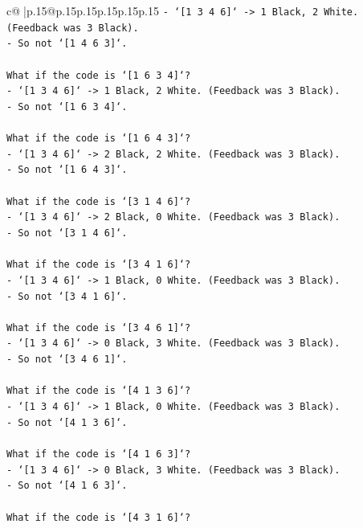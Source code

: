 \documentclass{article}
\begin{document}
{\begin{supertabular}{c@{$\;$}|p{.15\linewidth}@{}p{.15\linewidth}p{.15\linewidth}p{.15\linewidth}p{.15\linewidth}p{.15\linewidth}}
{{{\texttt{{-} `{[}1 3 4 6{]}` {-}> 1 Black, 2 White. (Feedback was 3 Black).} \\
\texttt{{-} So not `{[}1 4 6 3{]}`.} \\
\\ 
\texttt{What if the code is `{[}1 6 3 4{]}`?} \\
\texttt{{-} `{[}1 3 4 6{]}` {-}> 1 Black, 2 White. (Feedback was 3 Black).} \\
\texttt{{-} So not `{[}1 6 3 4{]}`.} \\
\\ 
\texttt{What if the code is `{[}1 6 4 3{]}`?} \\
\texttt{{-} `{[}1 3 4 6{]}` {-}> 2 Black, 2 White. (Feedback was 3 Black).} \\
\texttt{{-} So not `{[}1 6 4 3{]}`.} \\
\\ 
\texttt{What if the code is `{[}3 1 4 6{]}`?} \\
\texttt{{-} `{[}1 3 4 6{]}` {-}> 2 Black, 0 White. (Feedback was 3 Black).} \\
\texttt{{-} So not `{[}3 1 4 6{]}`.} \\
\\ 
\texttt{What if the code is `{[}3 4 1 6{]}`?} \\
\texttt{{-} `{[}1 3 4 6{]}` {-}> 1 Black, 0 White. (Feedback was 3 Black).} \\
\texttt{{-} So not `{[}3 4 1 6{]}`.} \\
\\ 
\texttt{What if the code is `{[}3 4 6 1{]}`?} \\
\texttt{{-} `{[}1 3 4 6{]}` {-}> 0 Black, 3 White. (Feedback was 3 Black).} \\
\texttt{{-} So not `{[}3 4 6 1{]}`.} \\
\\ 
\texttt{What if the code is `{[}4 1 3 6{]}`?} \\
\texttt{{-} `{[}1 3 4 6{]}` {-}> 1 Black, 0 White. (Feedback was 3 Black).} \\
\texttt{{-} So not `{[}4 1 3 6{]}`.} \\
\\ 
\texttt{What if the code is `{[}4 1 6 3{]}`?} \\
\texttt{{-} `{[}1 3 4 6{]}` {-}> 0 Black, 3 White. (Feedback was 3 Black).} \\
\texttt{{-} So not `{[}4 1 6 3{]}`.} \\
\\ 
\texttt{What if the code is `{[}4 3 1 6{]}`?} \\
}}}
\end{supertabular}}
\end{document}
